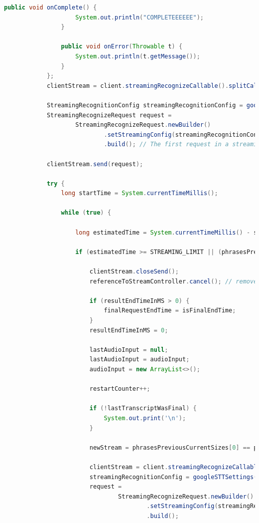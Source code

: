 \documentclass[oneside, 12pt]{book}
\begin{document}
\begin{center}
\begin{lstlisting}[language=java]
                public void onComplete() {
                    System.out.println("COMPLETEEEEEE");
                }

                public void onError(Throwable t) {
                    System.out.println(t.getMessage());
                }
            };
            clientStream = client.streamingRecognizeCallable().splitCall(responseObserver);

            StreamingRecognitionConfig streamingRecognitionConfig = googleSTTSettings();
            StreamingRecognizeRequest request =
                    StreamingRecognizeRequest.newBuilder()
                            .setStreamingConfig(streamingRecognitionConfig)
                            .build(); // The first request in a streaming call has to be a config

            clientStream.send(request);

            try {
                long startTime = System.currentTimeMillis();

                while (true) {

                    long estimatedTime = System.currentTimeMillis() - startTime;

                    if (estimatedTime >= STREAMING_LIMIT || (phrasesPreviousCurrentSizes[0] != phrasesPreviousCurrentSizes[1])) {

                        clientStream.closeSend();
                        referenceToStreamController.cancel(); // remove Observer

                        if (resultEndTimeInMS > 0) {
                            finalRequestEndTime = isFinalEndTime;
                        }
                        resultEndTimeInMS = 0;

                        lastAudioInput = null;
                        lastAudioInput = audioInput;
                        audioInput = new ArrayList<>();

                        restartCounter++;

                        if (!lastTranscriptWasFinal) {
                            System.out.print('\n');
                        }

                        newStream = phrasesPreviousCurrentSizes[0] == phrasesPreviousCurrentSizes[1];

                        clientStream = client.streamingRecognizeCallable().splitCall(responseObserver);
                        streamingRecognitionConfig = googleSTTSettings();
                        request =
                                StreamingRecognizeRequest.newBuilder()
                                        .setStreamingConfig(streamingRecognitionConfig)
                                        .build();


\end{lstlisting}
\end{center}
\end{document}
